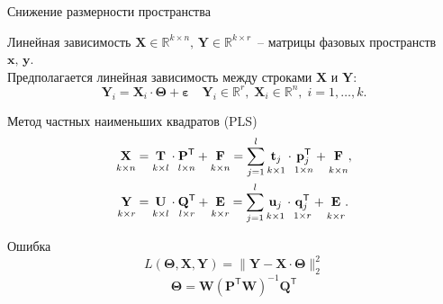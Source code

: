 \documentclass[9pt]{beamer}
\newcommand{\bx}{\mathbf{x}}
\newcommand{\by}{\mathbf{y}}
\newcommand{\bY}{\mathbf{Y}}
\newcommand{\bX}{\mathbf{X}}
\newcommand{\bu}{\mathbf{u}}
\newcommand{\bt}{\mathbf{t}}
\newcommand{\bp}{\mathbf{p}}
\newcommand{\bq}{\mathbf{q}}
\newcommand{\bP}{\mathbf{P}}
\newcommand{\bT}{\mathbf{T}}
\newcommand{\bQ}{\mathbf{Q}}
\newcommand{\bE}{\mathbf{E}}
\newcommand{\bF}{\mathbf{F}}
\newcommand{\bU}{\mathbf{U}}
\newcommand{\bbR}{\mathbb{R}}
\newcommand{\T}{\mathsf{T}}
\begin{document}
\begin{frame}{Снижение размерности пространства}
\begin{block}{Линейная зависимость}
\vspace{0.1cm}
	$\bX\in\bbR^{k\times n},\, \bY\in\bbR^{k\times r}$~-- матрицы фазовых пространств $\bx,\,\by$.\\
	Предполагается линейная зависимость между строками $\bX$ и $\bY$:
	\[
	    \mathbf{Y}_i = \mathbf{X}_i\cdot\mathbf{\Theta} + \boldsymbol{\varepsilon} \quad \mathbf{Y}_i\in\bbR^r,\;\mathbf{X}_i\in\bbR^n,\; i = 1,\ldots,k.
	\]
\end{block}
\vspace{-0.3cm}
\begin{block}{Метод частных наименьших квадратов (PLS)}
	\vspace{-0.5cm}
\begin{align*}
\underset{k \times n}{\vphantom{\bQ}\bX} 
&= \underset{k \times l}{\vphantom{\bQ}\bT} \cdot \underset{l \times n}{\vphantom{\bQ}\bP^{\T}} + \underset{k \times n}{\vphantom{\bQ}\bF} 
= \sum_{j=1}^l \underset{k \times 1}{\vphantom{\bp_j^{\T}}\bt_j} \cdot \underset{1 \times n}{\bp_j^{\T}} + \underset{k \times n}{\vphantom{\bp_j^{\T}}\bF},\\
\underset{k \times r}{\vphantom{\bQ}\bY} 
&= \underset{k \times l}{\vphantom{\bQ}\bU} \cdot \underset{l \times r}{\bQ^{\T}} + \underset{k \times r}{\vphantom{\bQ}\bE}
=  \sum_{j=1}^l  \underset{k \times 1}{\vphantom{\bq_j^{\T}}\bu_j} \cdot \underset{1 \times r}{\bq_j^{\T}} +  \underset{k\times r}{\vphantom{\bq_j^{\T}}\bE}.
\end{align*}
\end{block}
\vspace{-0.5cm}
\begin{block}{Ошибка}
	\vspace{-0.2cm}
\[
    L(\mathbf{\Theta}, \mathbf{X}, \mathbf{Y}) = \|\mathbf{Y} - \mathbf{X}\cdot\mathbf{\Theta}\|_2^2
\]
\vspace{-0.2cm}
\[
    \mathbf{\Theta} = \mathbf{W}(\mathbf{P}^{\mathsf{T}}\mathbf{W})^{-1}\mathbf{Q}^{\mathsf{T}}
\]
\end{block}

\end{frame}
\end{document}
